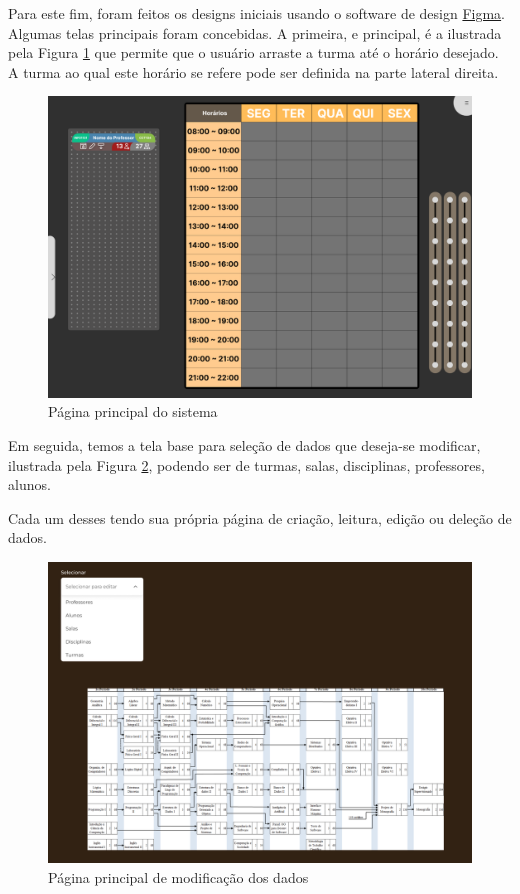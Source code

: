 Para este fim, foram feitos os designs iniciais usando o software de design \href{https://www.figma.com/}{Figma}. Algumas telas principais foram concebidas. A primeira, e principal, é a ilustrada pela Figura \ref{fig:main} que permite que o usuário arraste a turma até o horário desejado. A turma ao qual este horário se refere pode ser definida na parte lateral direita.

\begin{figure}[htbp]\centering
  \caption{\label{fig:main} Página principal do sistema}
  \includegraphics[scale=0.6]{files/img/Prototipo/Medio/main.png}
\end{figure} %

Em seguida, temos a tela base para seleção de dados que deseja-se modificar, ilustrada pela Figura \ref{fig:CRUD_main}, podendo ser de turmas, salas, disciplinas, professores, alunos.

Cada um desses tendo sua própria página de criação, leitura, edição ou deleção de dados.

\begin{figure}[htbp]\centering
  \caption{\label{fig:CRUD_main} Página principal de modificação dos dados}
  \includegraphics[scale=0.6]{files/img/Prototipo/Medio/CRUD_main.png}
\end{figure} %

